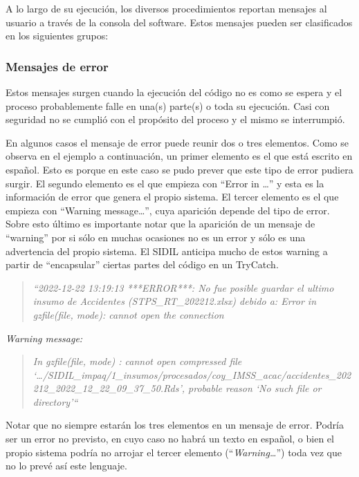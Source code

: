 \documentclass[
]{article}
\begin{document}
A lo largo de su ejecución, los diversos procedimientos reportan mensajes al usuario a través de la consola del software. Estos mensajes pueden ser clasificados en los siguientes grupos:

\hypertarget{mensajesError}{%
\subsubsection{Mensajes de error}\label{mensajesError}}

Estos mensajes surgen cuando la ejecución del código no es como se espera y el proceso probablemente falle en una(s) parte(s) o toda su ejecución. Casi con seguridad no se cumplió con el propósito del proceso y el mismo se interrumpió.

En algunos casos el mensaje de error puede reunir dos o tres elementos. Como se observa en el ejemplo a continuación, un primer elemento es el que está escrito en español. Esto es porque en este caso se pudo prever que este tipo de error pudiera surgir. El segundo elemento es el que empieza con ``Error in \ldots{}'' y esta es la información de error que genera el propio sistema. El tercer elemento es el que empieza con ``Warning message\ldots{}'', cuya aparición depende del tipo de error. Sobre esto último es importante notar que la aparición de un mensaje de ``warning'' por si sólo en muchas ocasiones no es un error y sólo es una advertencia del propio sistema. El SIDIL anticipa mucho de estos warning a partir de ``encapsular'' ciertas partes del código en un TryCatch.

\begin{quote}
\emph{``2022-12-22 13:19:13 ***ERROR***: No fue posible guardar el ultimo insumo de Accidentes (STPS\_RT\_202212.xlsx) debido a: Error in gzfile(file, mode): cannot open the connection}
\end{quote}

\emph{Warning message:}

\begin{quote}
\emph{In gzfile(file, mode) : cannot open compressed file `\ldots/SIDIL\_impaq/1\_insumos/procesados/coy\_IMSS\_acac/accidentes\_202212\_2022\_12\_22\_09\_37\_50.Rds', probable reason `No such file or directory'``}
\end{quote}

Notar que no siempre estarán los tres elementos en un mensaje de error. Podría ser un error no previsto, en cuyo caso no habrá un texto en español, o bien el propio sistema podría no arrojar el tercer elemento (``\emph{Warning\ldots{}}'') toda vez que no lo prevé así este lenguaje.
\end{document}
